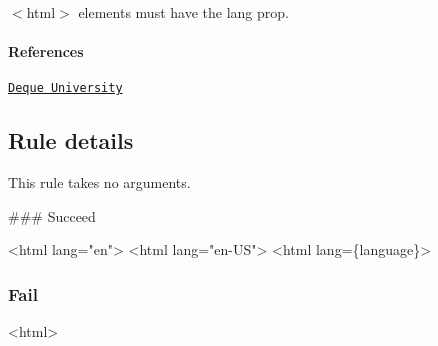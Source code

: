 $<$html$>$ elements must have the lang prop.

\paragraph*{References}


\begin{DoxyEnumerate}
\item \href{https://dequeuniversity.com/rules/axe/1.1/html-lang}{\tt Deque University}
\end{DoxyEnumerate}

\subsection*{Rule details}

This rule takes no arguments.

\#\#\# Succeed 
\begin{DoxyCode}
<html lang="en">
<html lang="en-US">
<html lang=\{language\}>
\end{DoxyCode}


\subsubsection*{Fail}


\begin{DoxyCode}
<html>
\end{DoxyCode}
 